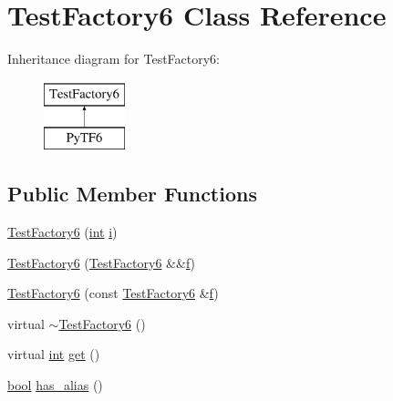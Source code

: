 \hypertarget{class_test_factory6}{}\section{Test\+Factory6 Class Reference}
\label{class_test_factory6}
Inheritance diagram for Test\+Factory6\+:\begin{figure}[H]
\begin{center}
\leavevmode
\includegraphics[height=2.000000cm]{class_test_factory6}
\end{center}
\end{figure}
\subsection*{Public Member Functions}
\begin{DoxyCompactItemize}
\item 
\mbox{\hyperlink{class_test_factory6_a6dcde4de2fa1a156b6cdd7fe7e11f347}{Test\+Factory6}} (\mbox{\hyperlink{warnings_8h_a74f207b5aa4ba51c3a2ad59b219a423b}{int}} \mbox{\hyperlink{abstract_8h_a13235ab5ddf5c2ccd5ca35ab01d91328}{i}})
\item 
\mbox{\hyperlink{class_test_factory6_ad68e8069eb575149773dd3fb50304653}{Test\+Factory6}} (\mbox{\hyperlink{class_test_factory6}{Test\+Factory6}} \&\&\mbox{\hyperlink{_s_d_l__opengl__glext_8h_a691492ec0bd6383f91200e49f6ae40ed}{f}})
\item 
\mbox{\hyperlink{class_test_factory6_acbd0e0e6edf8f4c9ddab2fdafd779ed1}{Test\+Factory6}} (const \mbox{\hyperlink{class_test_factory6}{Test\+Factory6}} \&\mbox{\hyperlink{_s_d_l__opengl__glext_8h_a691492ec0bd6383f91200e49f6ae40ed}{f}})
\item 
virtual \mbox{\hyperlink{class_test_factory6_a4ce0aff8b0ff14fa83ff6be0833a33d0}{$\sim$\+Test\+Factory6}} ()
\item 
virtual \mbox{\hyperlink{warnings_8h_a74f207b5aa4ba51c3a2ad59b219a423b}{int}} \mbox{\hyperlink{class_test_factory6_a2b86e7fb37163118f7833a1acf4f2a66}{get}} ()
\item 
\mbox{\hyperlink{asdl_8h_af6a258d8f3ee5206d682d799316314b1}{bool}} \mbox{\hyperlink{class_test_factory6_afb8d38ad2654433a76942071b035c934}{has\+\_\+alias}} ()
\end{DoxyCompactItemize}

